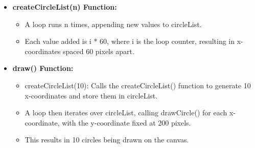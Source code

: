 \begin{exercisebox}[adjusted title= Explanation for Loops II]
\begin{itemize}
  \item \textbf{createCircleList(n) Function:}
 
  \begin{itemize}
  \item A loop runs n times, appending new values to circleList.
  \item Each value added is i * 60, where i is the loop counter, resulting in x-coordinates spaced 60 pixels apart.
		
  \end{itemize}
  \item \textbf{draw() Function:}
  \begin{itemize}
  \item createCircleList(10): Calls the createCircleList() function to generate 10 x-coordinates and store them in circleList.
\item	 A loop then iterates over circleList, calling drawCircle() for each x-coordinate, with the y-coordinate fixed at 200 pixels.
\item This results in 10 circles being drawn on the canvas.
  \end{itemize}
  \end{itemize}
\end{exercisebox}

